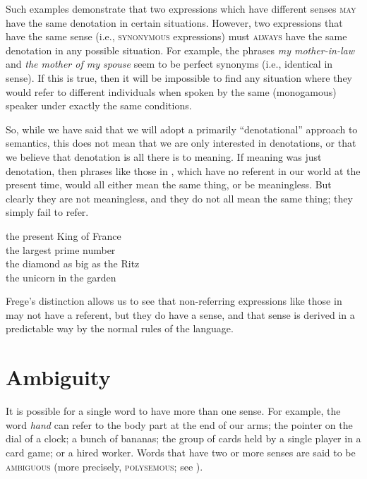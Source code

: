 Such examples demonstrate that two expressions which have different senses \textsc{may} have the same denotation in certain situations. However, two expressions that have the same sense (i.e., \textsc{synonymous} expressions) must \textsc{always} have the same denotation in any possible situation. For example, the phrases \textit{my mother-in-law} and \textit{the mother of my spouse} seem to be perfect synonyms (i.e., identical in sense). If this is true, then it will be impossible to find any situation where they would refer to different individuals when spoken by the same (monogamous) speaker under exactly the same conditions.



So, while we have said that we will adopt a primarily “denotational” approach to semantics, this does not mean that we are only interested in denotations, or that we believe that denotation is all there is to meaning. If meaning was just denotation, then phrases like those in , which have no referent in our world at the present time, would all either mean the same thing, or be meaningless. But clearly they are not meaningless, and they do not all mean the same thing; they simply fail to refer. 


\ea \label{ex:2.12}
\ea the present King of France\\
\ex the largest prime number\\
\ex the diamond as big as the Ritz\\
\ex the unicorn in the garden
                       \z
\z


Frege’s distinction allows us to see that non-referring expressions like those in  may not have a referent, but they do have a sense, and that sense is derived in a predictable way by the normal rules of the language.


\section{Ambiguity}\label{sec:} %

It is possible for a single word to have more than one sense. For example, the word \textit{hand} can refer to the body part at the end of our arms; the pointer on the dial of a clock; a bunch of bananas; the group of cards held by a single player in a card game; or a hired worker. Words that have two or more senses are said to be \textsc{ambiguous} (more precisely, \textsc{polysemous}; see ).



